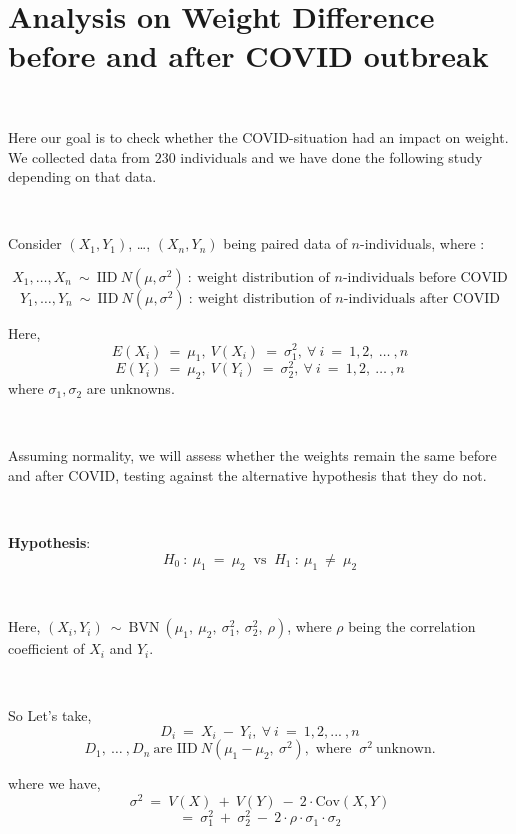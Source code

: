 \section{Analysis on Weight Difference before and after COVID outbreak}

\

Here our goal is to check whether the COVID-situation had an impact on weight. We collected data from $230$ individuals and we have done the following study depending on that data.

\ 

Consider $(X_{1}, Y_{1})$, \ldots , $(X_{n}, Y_{n})$ being paired data of $n$-individuals, where :

$$X_{1}, \ldots , X_{n} \ \sim \ \text{IID} \ N(\mu, \sigma^{2}) \ : \ \text{weight distribution of $n$-individuals before COVID}$$
$$Y_{1}, \ldots , Y_{n} \ \sim \ \text{IID} \ N(\mu, \sigma^{2}) \ : \ \text{weight distribution of $n$-individuals after COVID}$$

Here, 
$$E(X_{i}) \ = \ \mu_{1} , \ V(X_{i}) \ = \ \sigma_{1}^{2} , \ \forall \ i \ = \ 1, 2, \ \ldots \ , n$$
$$E(Y_{i}) \ = \ \mu_{2} , \ V(Y_{i}) \ = \ \sigma_{2}^{2} , \ \forall \ i \ = \ 1, 2, \ \ldots \ , n$$
where $\sigma_{1}, \sigma_{2}$ are unknowns.

\ 

Assuming normality, we will assess whether the weights remain the same before and after COVID, testing against the alternative hypothesis that they do not.

\ 

\textbf{Hypothesis}:
$$H_{0} \ : \ \mu_{1} \ = \ \mu_{2} \ \text{  vs  } \ H_{1} \ : \ \mu_{1} \ \neq \ \mu_{2}$$

\ 

Here, $(X_{i}, Y_{i}) \ \sim \ \text{BVN} \ (\mu_{1}, \ \mu_{2}, \ \sigma_{1}^{2}, \ \sigma_{2}^{2}, \ \rho)$, where $\rho$ being the correlation coefficient of $X_{i}$ and $Y_{i}$.

\ 

So Let's take, 
$$D_{i} \ = \ X_{i} \ - \ Y_{i}, \ \forall \ i \ = \ 1, 2, ... \ , n$$
$$D_{1}, \ \ldots \ , D_{n} \ \text{are IID} \ N(\mu_{1} - \mu_{2}, \ \sigma^{2}), \text{ where } \ \sigma^{2} \ \text{unknown}.$$

\newpage

where we have,
$$\sigma^{2} \ = \ V(X) \ + \ V(Y) \ - \ 2 \cdot \text{Cov} (X, Y)$$
$$= \ \sigma_{1}^{2} \ + \ \sigma_{2}^{2} \ - \ 2 \cdot \rho \cdot \sigma_{1} \cdot \sigma_{2}$$


